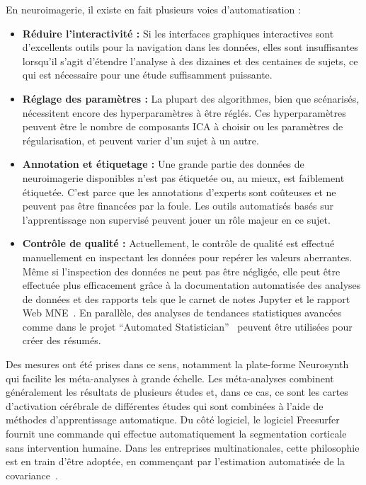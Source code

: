 En neuroimagerie, il existe en fait plusieurs voies d'automatisation :
\begin{itemize}[noitemsep,nolistsep,nosep]
\item \textbf{Réduire l'interactivité :} Si les interfaces graphiques interactives sont d'excellents outils pour la navigation dans les données, elles sont insuffisantes lorsqu'il s'agit d'étendre l'analyse à des dizaines et des centaines de sujets, ce qui est nécessaire pour une étude suffisamment puissante.

\item \textbf{Réglage des paramètres :} La plupart des algorithmes, bien que scénarisés, nécessitent encore des hyperparamètres à être réglés. Ces hyperparamètres peuvent être le nombre de composants ICA à choisir ou les paramètres de régularisation, et peuvent varier d'un sujet à un autre.
\item \textbf{Annotation et étiquetage :} Une grande partie des données de neuroimagerie disponibles n'est pas étiquetée ou, au mieux, est faiblement étiquetée. C'est parce que les annotations d'experts sont coûteuses et ne peuvent pas être financées par la foule. Les outils automatisés basés sur l'apprentissage non supervisé peuvent jouer un rôle majeur en ce sujet.
%
\item \textbf{Contrôle de qualité :} Actuellement, le contrôle de qualité est effectué manuellement en inspectant les données pour repérer les valeurs aberrantes. Même si l'inspection des données ne peut pas être négligée, elle peut être effectuée plus efficacement grâce à la documentation automatisée des analyses de données et des rapports tels que le carnet de notes Jupyter et le rapport Web MNE~\citep{dengemann2015conc}. En parallèle, des analyses de tendances statistiques avancées comme dans le projet ``Automated Statistician''~\citep{duvenaud2013structure} peuvent être utilisées pour créer des résumés.
\end{itemize}

Des mesures ont été prises dans ce sens, notamment la plate-forme Neurosynth~\citep{yarkoni2011large} qui facilite les méta-analyses à grande échelle. Les méta-analyses combinent généralement les résultats de plusieurs études et, dans ce cas, ce sont les cartes d'activation cérébrale de différentes études qui sont combinées à l'aide de méthodes d'apprentissage automatique. Du côté logiciel, le logiciel Freesurfer~\citep{dale-fischl-etal:99, fischl-serena-etal:99} fournit une commande  qui effectue automatiquement la segmentation corticale sans intervention humaine. Dans les entreprises multinationales, cette philosophie est en train d'être adoptée, en commençant par l'estimation automatisée de la covariance~\citep{engemann2015automated_new}.

